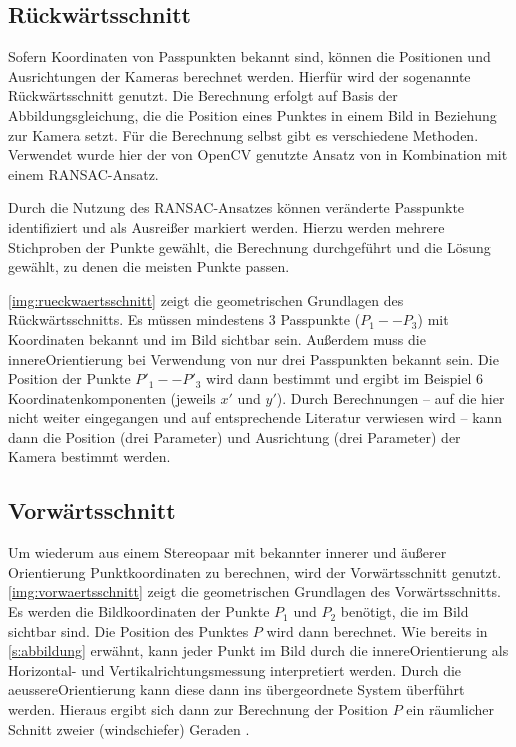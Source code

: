 \documentclass[./00PhotoBox.tex]{subfiles}
\begin{document}
\subsection{Rückwärtsschnitt}
Sofern Koordinaten von Passpunkten bekannt sind, können die Positionen und Ausrichtungen der Kameras berechnet werden. Hierfür wird der sogenannte Rückwärtsschnitt genutzt. Die Berechnung erfolgt auf Basis der Abbildungsgleichung, die die Position eines Punktes in einem Bild in Beziehung zur Kamera setzt. Für die Berechnung selbst gibt es verschiedene Methoden. Verwendet wurde hier der von OpenCV genutzte Ansatz von \citet{Lepetit2008} in Kombination mit einem RANSAC-Ansatz.

Durch die Nutzung des RANSAC-Ansatzes können veränderte Passpunkte identifiziert und als Ausreißer markiert werden. Hierzu werden mehrere Stichproben der Punkte gewählt, die Berechnung durchgeführt und die Lösung gewählt, zu denen die meisten Punkte passen. \citep[vgl.][S. 134]{luhmann}

\autoref{img:rueckwaertsschnitt} zeigt die geometrischen Grundlagen des Rückwärtsschnitts. Es müssen mindestens 3 Passpunkte ($P_1 - - P_3$) mit Koordinaten bekannt und im Bild sichtbar sein. Außerdem muss die \gls{innereOrientierung} bei Verwendung von nur drei Passpunkten bekannt sein. Die Position der Punkte $P'_1 - - P'_3$ wird dann bestimmt und ergibt im Beispiel 6 Koordinatenkomponenten (jeweils $x'$ und $y'$). Durch Berechnungen -- auf die hier nicht weiter eingegangen und auf entsprechende Literatur verwiesen wird -- kann dann die Position (drei Parameter) und Ausrichtung (drei Parameter) der Kamera bestimmt werden. \citep[vgl.][S. 284]{luhmann}

\subsection{Vorwärtsschnitt}
Um wiederum aus einem Stereopaar mit bekannter innerer und äußerer Orientierung Punktkoordinaten zu berechnen, wird der Vorwärtsschnitt genutzt. \autoref{img:vorwaertsschnitt} zeigt die geometrischen Grundlagen des Vorwärtsschnitts. Es werden die Bildkoordinaten der Punkte $P_1$ und $P_2$ benötigt, die im Bild sichtbar sind. Die Position des Punktes $P$ wird dann berechnet. Wie bereits in \autoref{s:abbildung} erwähnt, kann jeder Punkt im Bild durch die \gls{innereOrientierung} als Horizontal- und Vertikalrichtungsmessung interpretiert werden. Durch die \gls{aeussereOrientierung} kann diese dann ins übergeordnete System überführt werden. Hieraus ergibt sich dann zur Berechnung der Position $P$ ein räumlicher Schnitt zweier (windschiefer) Geraden \citep[vgl.][S. 95]{luhmann}.
\end{document}
